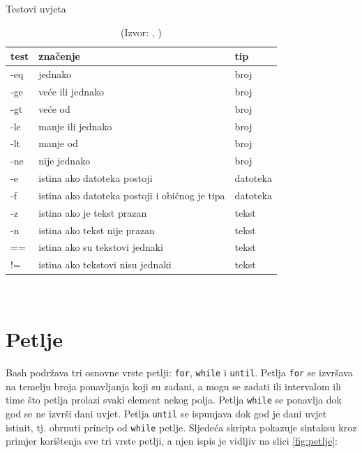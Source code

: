\documentclass{foi}
\begin{document}
\begin{table}[h!] 
    \centering
    \caption{Testovi uvjeta}
    \begin{tabularx}{0.8\textwidth}{|X|X|X|}
        \hline
         \cellcolor{gray!25} test & \cellcolor{gray!25} značenje & \cellcolor{gray!25} tip \\
        \hline
        -eq & jednako & broj \\
        \hline
        -ge & veće ili jednako & broj \\
        \hline
        -gt & veće od & broj \\
        \hline
        -le & manje ili jednako & broj \\
        \hline
        -lt & manje od & broj \\
        \hline
        -ne & nije jednako & broj \\
        \hline
        -e & istina ako datoteka postoji & datoteka \\
        \hline
        -f & istina ako datoteka postoji i običnog je tipa & datoteka \\
        \hline
        -z & istina ako je tekst prazan & tekst \\
        \hline
        -n & istina ako tekst nije prazan & tekst \\
        \hline
        == & istina ako su tekstovi jednaki & tekst \\
        \hline
        != & istina ako tekstovi nisu jednaki & tekst \\
        \hline
    \end{tabularx}
    \\[10pt]
    \caption*{(Izvor: \cite{LinuxCommandTest}, \cite{Geeks})}
    \label{tab:objekti}
\end{table}

\section{Petlje}
Bash podržava tri osnovne vrste petlji: \verb|for|, \verb|while| i \verb|until|. Petlja \verb|for| se izvršava na temelju broja ponavljanja koji su zadani, a mogu se zadati ili intervalom ili time što petlja prolazi svaki element nekog polja. Petlja \verb|while| se ponavlja dok god se ne izvrši dani uvjet. Petlja \verb|until| se ispunjava dok god je dani uvjet istinit, tj. obrnuti princip od \verb|while| petlje. Sljedeća skripta pokazuje sintaksu kroz primjer korištenja sve tri vrste petlji, a njen ispis je vidljiv na slici \ref{fig:petlje}:
\end{document}
